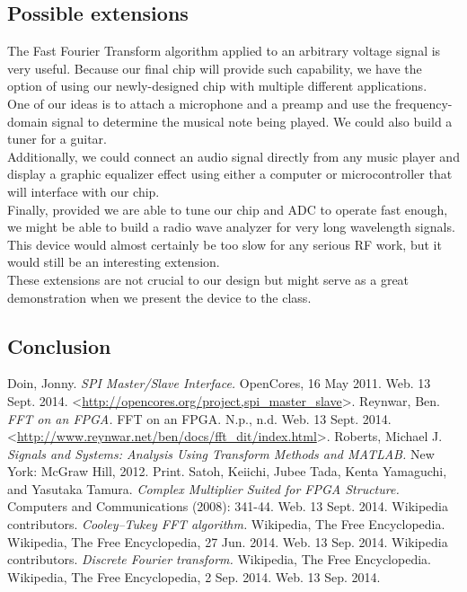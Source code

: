 \documentclass[12pt]{article}
\begin{document}
  \subsection*{Possible extensions}
    The Fast Fourier Transform algorithm applied to an arbitrary voltage signal is very useful. Because our final chip will provide such capability, we have the option of using our newly-designed chip with multiple different applications. \\
  
    One of our ideas is to attach a microphone and a preamp and use the frequency-domain signal to determine the musical note being played. We could also build a tuner for a guitar. \\
    
    Additionally, we could connect an audio signal directly from any music player and display a graphic equalizer effect using either a computer or microcontroller that will interface with our chip. \\

    Finally, provided we are able to tune our chip and ADC to operate fast enough, we might be able to build a radio wave analyzer for very long wavelength signals. This device would almost certainly be too slow for any serious RF work, but it would still be an interesting extension. \\

    These extensions are not crucial to our design but might serve as a great demonstration when we present the device to the class.
  \subsection*{Conclusion}

  \begin{thebibliography}{9}
      Doin, Jonny. \emph{SPI Master/Slave Interface.} OpenCores, 16 May 2011. Web. 13 Sept. 2014. \textless\url{http://opencores.org/project,spi_master_slave}\textgreater.
      Reynwar, Ben. \emph{FFT on an FPGA.} FFT on an FPGA. N.p., n.d. Web. 13 Sept. 2014. \textless\url{http://www.reynwar.net/ben/docs/fft_dit/index.html}\textgreater.
      Roberts, Michael J. \emph{Signals and Systems: Analysis Using Transform Methods and MATLAB.} New York: McGraw Hill, 2012. Print.
      Satoh, Keiichi, Jubee Tada, Kenta Yamaguchi, and Yasutaka Tamura. \emph{Complex Multiplier Suited for FPGA Structure.} Computers and Communications (2008): 341-44. Web. 13 Sept. 2014.
      Wikipedia contributors. \emph{Cooley–Tukey FFT algorithm.} Wikipedia, The Free Encyclopedia. Wikipedia, The Free Encyclopedia, 27 Jun. 2014. Web. 13 Sep. 2014.
      Wikipedia contributors. \emph{Discrete Fourier transform.} Wikipedia, The Free Encyclopedia. Wikipedia, The Free Encyclopedia, 2 Sep. 2014. Web. 13 Sep. 2014.
  \end{thebibliography}
\end{document}
